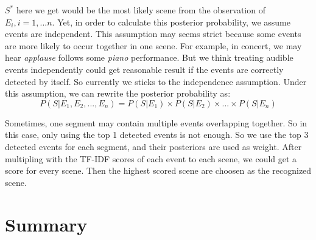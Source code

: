 $S^*$ here we get would be the most likely scene from the observation of $E_i, i = 1,...n$.  
Yet, in order to calculate this posterior probability, we assume events are independent. 
This assumption may seems strict because some events are more likely to occur together in one scene. 
For example, in concert, we may hear \textit{applause} follows some \textit{piano} performance. 
But we think treating audible events independently could get reasonable result if the events are correctly detected by itself. 
So currently we sticks to the independence assumption. 
Under this assumption, we can rewrite the posterior probability as: 
\begin{equation}
P(S|E_1,E_2,...,E_n) = P(S|E_1) \times P(S|E_2) \times ... \times P(S|E_n)
\end{equation}

Sometimes, one segment may contain multiple events overlapping together. 
So in this case, only using the top 1 detected events is not enough. 
So we use the top 3 detected events for each segment, and their posteriors are used as weight. 
After multipling with the TF-IDF scores of each event to each scene, we could get a score for every scene. 
Then the highest scored scene are choosen as the recognized scene. 

\section{Summary}
